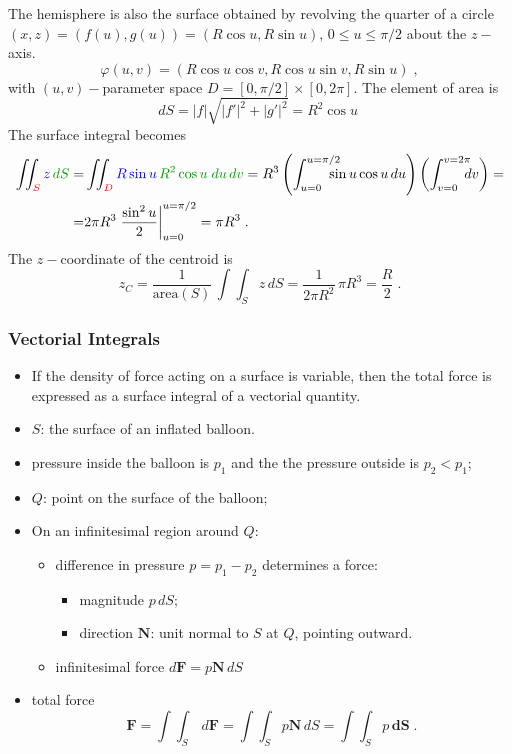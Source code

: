 \begin{frame}

The hemisphere is also the surface obtained by revolving the quarter of a circle  $(x,z) = (f(u), g(u)) = (R\cos{u}, R\sin{u})$, $0 \leqslant u \leqslant \pi/2$ about the $z-$axis. \pause
%
$$\varphi(u,v) = (R\cos{u}\cos{v}, R\cos{u}\sin{v}, R\sin{u}) \; ,$$
%
with $(u,v)-$parameter space $D=$\pause $[0,\pi/2]\times [0,2\pi]$. \pause The element of area is
%
$$dS = |f|\sqrt{|f'|^2+|g'|^2} = R^2\cos{u}\;$$
%
\pause The surface integral becomes
%
\begin{align*}
  \int\!\!\!\int_{\textcolor[rgb]{0.98,0.00,0.00}{S}} \textcolor[rgb]{0.00,0.00,1.00}{z} \, \textcolor[rgb]{0.00,0.59,0.00}{dS} = & \int\!\!\!\int_{\textcolor[rgb]{0.98,0.00,0.00}{D}} \textcolor[rgb]{0.00,0.00,1.00}{R\sin{u}}\, \textcolor[rgb]{0.00,0.59,0.00}{R^2\cos{u}\; du\, dv} =  R^3 \left(\int_{u=0}^{u=\pi/2} \!\!\!\!\!\!\sin{u}\cos{u}\, du\right) \left( \int_{v=0}^{v=2\pi} \!\!\!\! dv \right) = \\
 = &2\pi R^3 \left. \frac{\sin^2{u}}{2} \right|_{u=0}^{u=\pi/2} =\pi R^3\; .
\end{align*}
%
\pause The $z-$coordinate of the centroid is
%
$$z_C = \frac{1}{\text{area}(S)}\, \int\!\!\!\int_S z \, dS = \frac{1}{2\pi R^2} \, \pi R^3 = \frac{R}{2}\; .$$
\end{frame}

\begin{frame}
  \frametitle{Vectorial Integrals}

\begin{itemize}
  \item \pause If the density of force acting on a surface is variable, then the total force is expressed as a surface integral of a vectorial quantity.
\end{itemize}

\begin{itemize}
  \item \pause $S$: the surface of an inflated balloon.
  \item \pause pressure inside the balloon is $p_1$ and the the pressure outside is $p_2 < p_1$;
  \item \pause $Q$: point on the surface of the balloon;
  \item On an infinitesimal region around $Q$:
  \begin{itemize}
    \item \pause difference in pressure $p = p_1-p_2$ determines a force:
        \begin{itemize}
          \item \pause magnitude $p\, dS$;
          \item \pause direction $\textbf{N}$: unit normal to $S$ at $Q$, pointing outward.
        \end{itemize}
    \item \pause infinitesimal force $d\textbf{F} = p \textbf{N} \, dS$
  \end{itemize}
  \item \pause total force
%
$$\bm{F} =  \int\!\!\!\int_S \, d\textbf{F} = \int\!\!\!\int_S p \textbf{N} \, dS = \int\!\!\!\int_S p\, \bm{dS} \; .$$
\end{itemize}
\end{frame}

